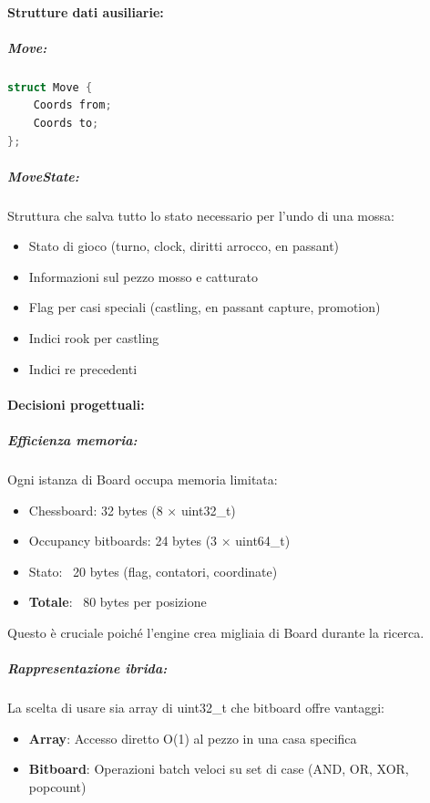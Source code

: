 \paragraph{Strutture dati ausiliarie:}

\subparagraph{Move:}
\begin{lstlisting}[language=C++]
struct Move {
    Coords from;
    Coords to;
};
\end{lstlisting}

\subparagraph{MoveState:}
Struttura che salva tutto lo stato necessario per l'undo di una mossa:
\begin{itemize}
  \item Stato di gioco (turno, clock, diritti arrocco, en passant)
  \item Informazioni sul pezzo mosso e catturato
  \item Flag per casi speciali (castling, en passant capture, promotion)
  \item Indici rook per castling
  \item Indici re precedenti
\end{itemize}

\paragraph{Decisioni progettuali:}

\subparagraph{Efficienza memoria:}
Ogni istanza di Board occupa memoria limitata:
\begin{itemize}
  \item Chessboard: 32 bytes (8 × uint32\_t)
  \item Occupancy bitboards: 24 bytes (3 × uint64\_t)
  \item Stato: ~20 bytes (flag, contatori, coordinate)
  \item \textbf{Totale}: ~80 bytes per posizione
\end{itemize}

Questo è cruciale poiché l'engine crea migliaia di Board durante la ricerca.

\subparagraph{Rappresentazione ibrida:}
La scelta di usare sia array di uint32\_t che bitboard offre vantaggi:
\begin{itemize}
  \item \textbf{Array}: Accesso diretto O(1) al pezzo in una casa specifica
  \item \textbf{Bitboard}: Operazioni batch veloci su set di case (AND, OR, XOR, popcount)
\end{itemize}

